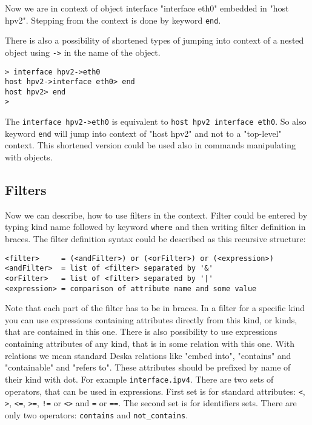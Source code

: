 \documentclass[deska]{subfiles}
\begin{document}
Now we are in context of object interface "interface eth0" embedded in "host hpv2". Stepping from the context is done by
keyword {\tt end}.

There is also a possibility of shortened types of jumping into context of a nested object using {\tt ->} in the name of the
object.

\begin{verbatim}
> interface hpv2->eth0
host hpv2->interface eth0> end
host hpv2> end
>
\end{verbatim}

The {\tt interface hpv2->eth0} is equivalent to {\tt host hpv2 interface eth0}. So also keyword {\tt end} will jump into context of
"host hpv2" and not to a "top-level" context. This shortened version could be used also in commands manipulating with
objects.

\subsection{Filters}

Now we can describe, how to use filters in the context. Filter could be entered by typing kind name followed by keyword
{\tt where} and then writing filter definition in braces. The filter definition syntax could be described as this recursive
structure:

\begin{verbatim}
<filter>     = (<andFilter>) or (<orFilter>) or (<expression>)
<andFilter>  = list of <filter> separated by '&'
<orFilter>   = list of <filter> separated by '|'
<expression> = comparison of attribute name and some value
\end{verbatim}

Note that each part of the filter has to be in braces. In a filter for a specific kind you can use expressions containing
attributes directly from this kind, or kinds, that are contained in this one. There is also possibility to use expressions
containing attributes of any kind, that is in some relation with this one. With relations we mean standard Deska relations
like "embed into", "contains" and "containable" and "refers to". These attributes should be prefixed by name of their
kind with dot. For example {\tt interface.ipv4}. There are two sets of operators, that can be used in expressions. First
set is for standard attributes: {\tt <}, {\tt >}, {\tt <=}, {\tt >=}, {\tt !=} or {\tt <>} and {\tt =} or {\tt ==}. The second set is for identifiers
sets. There are only two operators: {\tt contains} and {\tt not\_contains}.
\end{document}

